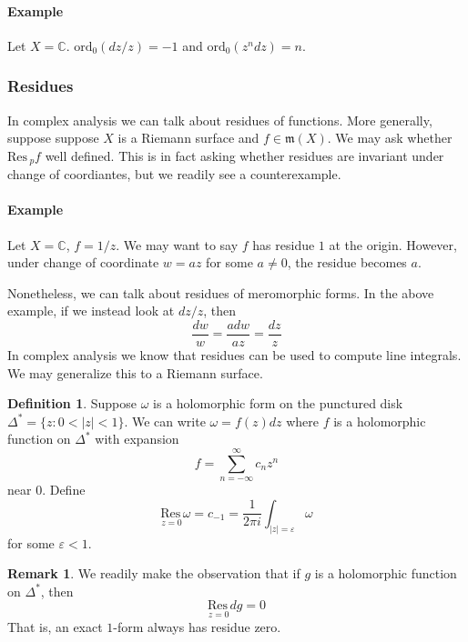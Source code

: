 \documentclass[12pt]{article}
\theoremstyle{plain}
\theoremstyle{definition}
\newtheorem{definition}[equation]{Definition}
\newtheorem{remark}[equation]{Remark}
\newcommand{\fm}{\mathfrak{m}}
\newcommand{\IC}{\mathbb{C}}
\newcommand{\Res}{\mathrm{Res}\,}
\newcommand{\<}{\langle}
\renewcommand{\>}{\rangle}
\newcommand{\w}{\omega}
\newcommand{\ord}{\mathrm{ord}}
\newcommand{\const}{\frac{1}{2\pi i}}
\newcommand{\sm}{\varepsilon}
\newcommand{\Resz}{\underset{z = 0}{\Res}}
\begin{document}
\paragraph{Example} Let $X = \IC$. $\ord_0(dz/z) = -1$ and $\ord_0 (z^n dz) = n$. 

\subsubsection{Residues}

In complex analysis we can talk about residues of functions. More generally, suppose suppose $X$ is a Riemann surface and $f \in \fm(X)$. We may ask whether $\Res_p f$ well defined. This is in fact asking whether residues are invariant under change of coordiantes, but we readily see a counterexample. 

\paragraph{Example} Let $X = \IC$, $f = 1/z$. We may want to say $f$ has residue $1$ at the origin. However, under change of coordinate $w = az$ for some $a \neq 0$, the residue becomes $a$. 

Nonetheless, we can talk about residues of meromorphic forms. In the above example, if we instead look at $dz/z$, then 
$$ \frac{dw}{w} = \frac{a dw}{az} = \frac{dz}{z} $$
In complex analysis we know that residues can be used to compute line integrals. We may generalize this to a Riemann surface.
\begin{definition}
Suppose $\w$ is a holomorphic form on the punctured disk $\Delta^* = \{ z : 0 < |z| < 1 \}$. We can write $\w = f(z) dz$ where $f$ is a holomorphic function on $\Delta^*$ with expansion
$$ f = \sum_{ n = -\infty}^{\infty} c_n z^n $$ near $0$. Define 
$$ \Resz \w = c_{-1} = \const \int_{|z| = \sm} \w $$
for some $\sm < 1$. 
\end{definition}  
\begin{remark}
We readily make the observation that if $g$ is a holomorphic function on $\Delta^*$, then $$
\Resz dg = 0 $$
That is, an exact $1$-form always has residue zero. 
\end{remark}
\end{document}

